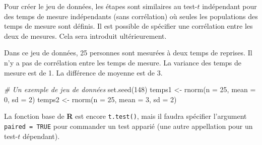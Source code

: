 \documentclass[
]{book}
\newenvironment{Shaded}{}{}
\newcommand{\AttributeTok}[1]{#1}
\newcommand{\CommentTok}[1]{\textit{#1}}
\newcommand{\ConstantTok}[1]{#1}
\newcommand{\DecValTok}[1]{#1}
\newcommand{\FunctionTok}[1]{#1}
\newcommand{\NormalTok}[1]{#1}
\newcommand{\OtherTok}[1]{#1}
\begin{document}
Pour créer le jeu de données, les étapes sont similaires au test-\(t\) indépendant pour des temps de mesure indépendants (sans corrélation) où seules les populations des temps de mesure sont définis. Il est possible de spécifier une corrélation entre les deux de mesures. Cela sera introduit ultérieurement.

Dans ce jeu de données, 25 personnes sont mesurées à deux temps de reprises. Il n'y a pas de corrélation entre les temps de mesure. La variance des temps de mesure est de 1. La différence de moyenne est de 3.

\begin{Shaded}
\begin{Highlighting}[]
\CommentTok{\# Un exemple de jeu de données}
\FunctionTok{set.seed}\NormalTok{(}\DecValTok{148}\NormalTok{)}
\NormalTok{temps1 }\OtherTok{\textless{}{-}} \FunctionTok{rnorm}\NormalTok{(}\AttributeTok{n =} \DecValTok{25}\NormalTok{, }\AttributeTok{mean =} \DecValTok{0}\NormalTok{, }\AttributeTok{sd =} \DecValTok{2}\NormalTok{)}
\NormalTok{temps2 }\OtherTok{\textless{}{-}} \FunctionTok{rnorm}\NormalTok{(}\AttributeTok{n =} \DecValTok{25}\NormalTok{, }\AttributeTok{mean =} \DecValTok{3}\NormalTok{, }\AttributeTok{sd =} \DecValTok{2}\NormalTok{)}
\end{Highlighting}
\end{Shaded}

La fonction base de \textbf{R} est encore \texttt{t.test()}, mais il faudra spécifier l'argument \texttt{paired\ =\ TRUE} pour commander un test apparié (une autre appellation pour un test-\(t\) dépendant).

\begin{Shaded}
\end{Shaded}
\end{document}

